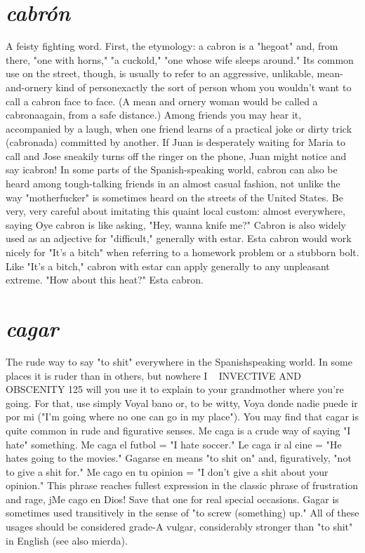 \section{\emph{cabrón}}

A feisty fighting word. First, the etymology: a cabron is a "hegoat" and, from there, "one with horns," "a cuckold," "one whose wife
sleeps around." Its common use on the street, though, is usually to
refer to an aggressive, unlikable, mean-and-ornery kind of personexactly the sort of person whom you wouldn't want to call a cabron
face to face. (A mean and ornery woman would be called a cabronaagain, from a safe distance.) Among friends you may hear it, accompanied by a laugh, when one friend learns of a practical joke or dirty trick
(cabronada) committed by another. If Juan is desperately waiting for
Maria to call and Jose sneakily turns off the ringer on the phone, Juan
might notice and say icabron! In some parts of the Spanish-speaking
world, cabron can also be heard among tough-talking friends in an almost casual fashion, not unlike the way "motherfucker" is sometimes
heard on the streets of the United States. Be very, very careful about
imitating this quaint local custom: almost everywhere, saying Oye cabron is like asking, "Hey, wanna knife me?" Cabron is also widely
used as an adjective for "difficult," generally with estar. Esta cabron
would work nicely for "It's a bitch" when referring to a homework
problem or a stubborn bolt. Like "It's a bitch," cabron with estar can
apply generally to any unpleasant extreme. "How about this heat?"
Esta cabron.

\section{\emph{cagar}}

The rude way to say "to shit" everywhere in the Spanishspeaking world. In some places it is ruder than in others, but nowhere
I ~
INVECTIVE AND OBSCENITY 125
will you use it to explain to your grandmother where you're going. For
that, use simply Voyal bano or, to be witty, Voya donde nadie puede
ir por mi ("I'm going where no one can go in my place").
You may find that cagar is quite common in rude and figurative senses. Me caga is a crude way of saying "I hate" something. Me
caga el futbol = "I hate soccer." Le caga ir al cine = "He hates going
to the movies." Gagarse en means "to shit on" and, figuratively, "not
to give a shit for." Me cago en tu opinion = "I don't give a shit about
your opinion." This phrase reaches fullest expression in the classic
phrase of frustration and rage, jMe cago en Dios! Save that one for real
special occasions. Gagar is sometimes used transitively in the sense of
"to screw (something) up." All of these usages should be considered
grade-A vulgar, considerably stronger than "to shit" in English (see
also mierda).

